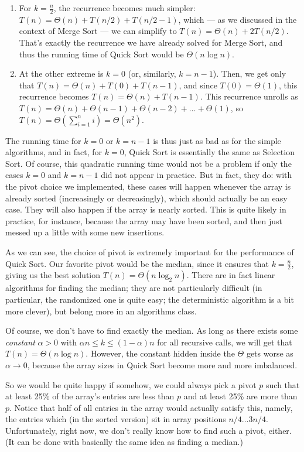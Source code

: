 \begin{enumerate}
\item For $k = \frac{n}{2}$, the recurrence becomes much simpler:
$T(n) = \Theta(n) + T(n/2) + T(n/2-1)$, which --- as we discussed in
the context of Merge Sort --- we can simplify to
$T(n) = \Theta(n) + 2 T(n/2)$.
That's exactly the recurrence we have already solved for Merge Sort,
and thus the running time of Quick Sort would be 
$\Theta(n \log n)$.
\item At the other extreme is $k = 0$ (or, similarly, $k=n-1$).
Then, we get only that $T(n) = \Theta(n) + T(0) + T(n-1)$, and since
$T(0) = \Theta(1)$, this recurrence becomes $T(n) = \Theta(n) + T(n-1)$.
This recurrence unrolls as 
$T(n) = \Theta(n) + \Theta(n-1) + \Theta(n-2) + \ldots + \Theta(1)$,
so $T(n) = \Theta(\sum_{i=1}^n i) = \Theta(n^2)$.
\end{enumerate}
The running time for $k=0$ or $k=n-1$ is thus just as bad as for the
simple algorithms, and in fact, for $k=0$, Quick Sort is essentially
the same as Selection Sort.
Of course, this quadratic running time would not be a problem if only
the cases $k=0$ and $k=n-1$ did not appear in practice. 
But in fact, they do: with the pivot choice we implemented, these
cases will happen whenever the array is already sorted (increasingly
or decreasingly), which should actually be an easy case. They will
also happen if the array is nearly sorted. This is quite likely in
practice, for instance, because the array may have been sorted, and
then just messed up a little with some new insertions.

As we can see, the choice of pivot is extremely important for the
performance of Quick Sort. Our favorite pivot would be the median,
since it ensures that $k = \frac{n}{2}$, giving us the best solution
$T(n) = \Theta(n \log_2 n)$. 
There are in fact linear algorithms for finding the median; they are
not particularly difficult (in particular, the randomized one is quite
easy; the deterministic algorithm is a bit more clever), but belong
more in an algorithms class.

Of course, we don't have to find exactly the median.
As long as there exists some \emph{constant} $\alpha > 0$
with $\alpha n \leq k \leq (1- \alpha) n$ for all recursive calls, we
will get that $T(n) = \Theta (n \log n)$. 
However, the constant hidden inside the $\Theta$ gets worse as
$\alpha \to 0$, because the array sizes in Quick Sort become more 
and more imbalanced. 

So we would be quite happy if somehow, we could always pick a pivot
$p$ such that at least 25\% of the array's entries are less than $p$
and at least 25\% are more than $p$. Notice that half of all entries
in the array would actually satisfy this, namely, the entries which
(in the sorted version) sit in array positions $n/4 \ldots 3n/4$.
Unfortunately, right now, we don't really know how to find such a
pivot, either. (It can be done with basically the same idea as finding
a median.)

